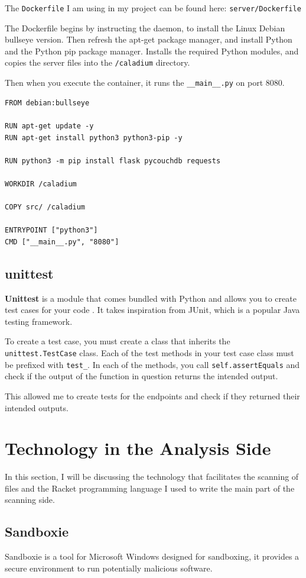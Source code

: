The \texttt{Dockerfile} I am using in my project can be found here:
\texttt{server/Dockerfile}

The Dockerfile begins by instructing the daemon,
to install the Linux Debian bullseye version.
Then refresh the apt-get package manager,
and install Python and the Python pip package manager.
Installs the required Python modules,
and copies the server files into the \texttt{/caladium} directory.

Then when you execute the container,
it runs the \texttt{\_\_main\_\_.py} on port 8080.

\begin{lstlisting}
FROM debian:bullseye

RUN apt-get update -y
RUN apt-get install python3 python3-pip -y

RUN python3 -m pip install flask pycouchdb requests

WORKDIR /caladium

COPY src/ /caladium

ENTRYPOINT ["python3"]
CMD ["__main__.py", "8080"]
\end{lstlisting}

\subsection{unittest}
\textbf{Unittest} is a module that comes bundled with Python
and allows you to create test cases for your code \cite{unittest}.
It takes inspiration from JUnit, which is a popular Java testing framework.

To create a test case, you must create a class
that inherits the \texttt{unittest.TestCase} class.
Each of the test methods in your test case class
must be prefixed with \texttt{test\_}.
In each of the methods, you call \texttt{self.assertEquals}
and check if the output of the function in question returns the intended output.

This allowed me to create tests for the endpoints and check
if they returned their intended outputs.

\section{Technology in the Analysis Side}
In this section, I will be discussing the technology that
facilitates the scanning of files and the Racket programming language
I used to write the main part of the scanning side.

\subsection{Sandboxie}
Sandboxie \cite{sandboxie} is a tool for Microsoft Windows designed for sandboxing,
it provides a secure environment to run potentially malicious software.

